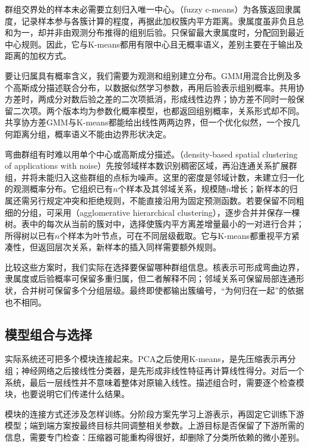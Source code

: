 群组交界处的样本未必需要立刻归入唯一中心。（fuzzy c-means）为各簇返回隶属度，记录样本参与各簇计算的程度，再据此加权簇内平方距离。隶属度虽非负且总和为一，却并非由观测分布推得的组别后验。只保留最大隶属度时，分配回到最近中心规则。因此，它与K-means都用有限中心且无概率语义，差别主要在于输出及距离的加权方式。

要让归属具有概率含义，我们需要为观测和组别建立分布。GMM用混合比例及多个高斯成分描述联合分布，以数据似然学习参数，再用后验表示组别概率。共用协方差时，两成分对数后验之差的二次项抵消，形成线性边界；协方差不同时一般保留二次项。两个版本均为参数化概率模型，也都返回组别概率，关系形式却不同。共享协方差GMM与K-means都能给出线性两两边界，但一个优化似然，一个按几何距离分组，概率语义不能由边界形状决定。

弯曲群组有时难以用单个中心或高斯成分描述。（density-based spatial clustering of applications with noise）先按邻域样本数识别稠密区域，再沿连通关系扩展群组，并将未能归入这些群组的点标为噪声。这里的密度是邻域计数，未建立归一化的观测概率分布。它组织已有$n$个样本及其邻域关系，规模随$n$增长；新样本的归属还需另行规定冲突和拒绝规则，不能直接沿用为固定预测函数。若要保留不同粗细的分组，可采用（agglomerative hierarchical clustering），逐步合并并保存一棵树。表中的每次从当前的簇对中，选择使簇内平方离差增量最小的一对进行合并；所得树以已有$n$个样本为叶节点，可在不同层级截取。它与K-means都重视平方紧凑性，但返回层次关系，新样本的插入同样需要额外规则。

比较这些方案时，我们实际在选择要保留哪种群组信息。核表示可形成弯曲边界，隶属度或后验概率可保留多重归属，但二者解释不同；邻域关系可保留局部连通形状，合并树可保留多个分组层级。最终即使都输出簇编号，“为何归在一起”的依据也不相同。

\FloatBarrier
\subsection{模型组合与选择}
\label{sec:models-combination-selection}

实际系统还可把多个模块连接起来。PCA之后使用K-means，是先压缩表示再分组；神经网络之后接线性分类器，是先形成非线性特征再计算线性得分。对后一个系统，最后一层线性并不意味着整体对原输入线性。描述组合时，需要逐个检查模块，也要说明它们传递什么结果。

模块的连接方式还涉及怎样训练。分阶段方案先学习上游表示，再固定它训练下游模型；端到端方案按最终目标共同调整相关参数。上游目标是否保留了下游所需的信息，需要专门检查：压缩器可能重构得很好，却删除了分类所依赖的微小差别。

